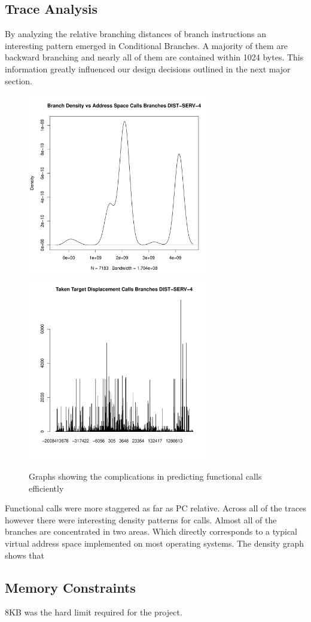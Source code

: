 \subsection{Trace Analysis}
By analyzing the relative branching distances of branch instructions an interesting pattern emerged in Conditional Branches. A majority of them are backward branching and nearly all of them are contained within 1024 bytes. This information greatly influenced our design decisions outlined in the next major section. 
\begin{figure}
\includegraphics[width=8cm]{"./Calls Branches DIST-SERV-4-density"}
\includegraphics[width=8cm]{"./Calls Branches DIST-SERV-4-histogram"}
\caption{Graphs showing the complications in predicting functional calls efficiently}
\end{figure}
Functional calls were more staggered as far as PC relative. Across all of the traces however there were interesting density patterns for calls. Almost all of the branches are concentrated in two areas. Which directly corresponds to a typical virtual address space implemented on most operating systems. The density graph shows that 

\subsection{Memory Constraints}
8KB was the hard limit required for the project.